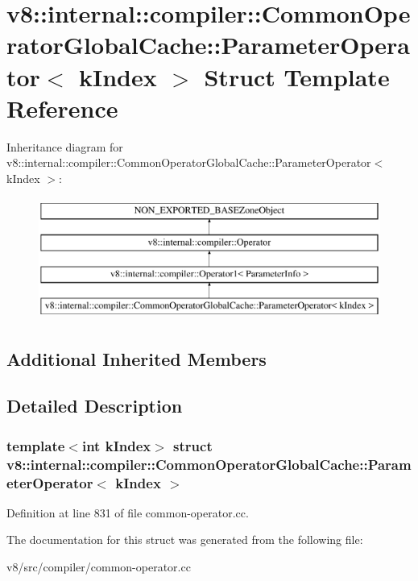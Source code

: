 \hypertarget{structv8_1_1internal_1_1compiler_1_1CommonOperatorGlobalCache_1_1ParameterOperator}{}\section{v8\+:\+:internal\+:\+:compiler\+:\+:Common\+Operator\+Global\+Cache\+:\+:Parameter\+Operator$<$ k\+Index $>$ Struct Template Reference}
\label{structv8_1_1internal_1_1compiler_1_1CommonOperatorGlobalCache_1_1ParameterOperator}
Inheritance diagram for v8\+:\+:internal\+:\+:compiler\+:\+:Common\+Operator\+Global\+Cache\+:\+:Parameter\+Operator$<$ k\+Index $>$\+:\begin{figure}[H]
\begin{center}
\leavevmode
\includegraphics[height=4.000000cm]{structv8_1_1internal_1_1compiler_1_1CommonOperatorGlobalCache_1_1ParameterOperator}
\end{center}
\end{figure}
\subsection*{Additional Inherited Members}


\subsection{Detailed Description}
\subsubsection*{template$<$int k\+Index$>$\newline
struct v8\+::internal\+::compiler\+::\+Common\+Operator\+Global\+Cache\+::\+Parameter\+Operator$<$ k\+Index $>$}



Definition at line 831 of file common-\/operator.\+cc.



The documentation for this struct was generated from the following file\+:\begin{DoxyCompactItemize}
\item 
v8/src/compiler/common-\/operator.\+cc\end{DoxyCompactItemize}
